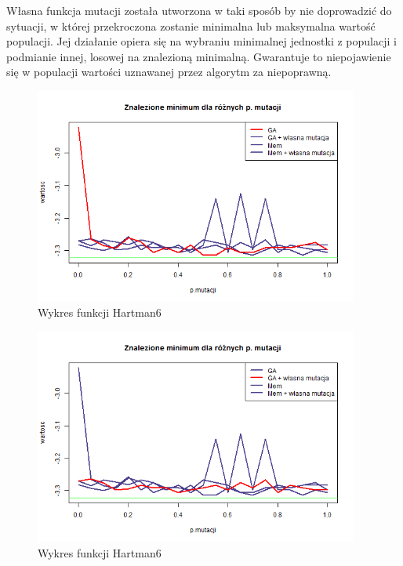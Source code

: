 \documentclass[11pt, a4paper]{article}
\newcommand{\fbi}{\leavevmode{\parindent=1em\indent}}
\begin{document}
\fbi
Własna funkcja mutacji została utworzona w taki sposób by nie doprowadzić do sytuacji, w której przekroczona zostanie minimalna lub maksymalna wartość populacji. Jej działanie opiera się na wybraniu minimalnej jednostki z populacji i podmianie innej, losowej na znalezioną minimalną. Gwarantuje to niepojawienie się w populacji wartości uznawanej przez algorytm za niepoprawną.

\begin{figure}[H]
	\centering
	\includegraphics[width=0.95\textwidth]{./assets/Hartman6mut1.png}
	\caption{Wykres funkcji Hartman6}
	\label{fig:Hartman6mut1}
\end{figure}

\begin{figure}[H]
	\centering
	\includegraphics[width=0.95\textwidth]{./assets/Hartman6mut2.png}
	\caption{Wykres funkcji Hartman6}
	\label{fig:Hartman6mut2}
\end{figure}
\end{document}
